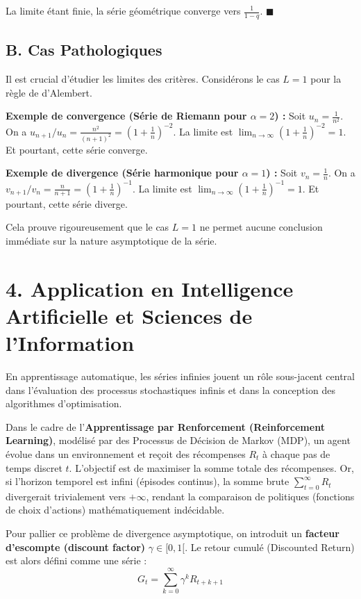 \documentclass[12pt, a4paper]{article}
\begin{document}
La limite étant finie, la série géométrique converge vers $\frac{1}{1 - q}$. $\blacksquare$

\subsection{B. Cas Pathologiques}

Il est crucial d'étudier les limites des critères. Considérons le cas $L=1$ pour la règle de d'Alembert.

\textbf{Exemple de convergence (Série de Riemann pour $\alpha=2$) :}
Soit $u_n = \frac{1}{n^2}$. On a $u_{n+1} / u_n = \frac{n^2}{(n+1)^2} = \left(1 + \frac{1}{n}\right)^{-2}$.
La limite est $\lim_{n \to \infty} \left(1 + \frac{1}{n}\right)^{-2} = 1$. Et pourtant, cette série converge.

\textbf{Exemple de divergence (Série harmonique pour $\alpha=1$) :}
Soit $v_n = \frac{1}{n}$. On a $v_{n+1} / v_n = \frac{n}{n+1} = \left(1 + \frac{1}{n}\right)^{-1}$.
La limite est $\lim_{n \to \infty} \left(1 + \frac{1}{n}\right)^{-1} = 1$. Et pourtant, cette série diverge.

Cela prouve rigoureusement que le cas $L=1$ ne permet aucune conclusion immédiate sur la nature asymptotique de la série.

\section{4. Application en Intelligence Artificielle et Sciences de l'Information}

En apprentissage automatique, les séries infinies jouent un rôle sous-jacent central dans l'évaluation des processus stochastiques infinis et dans la conception des algorithmes d'optimisation.

Dans le cadre de l'\textbf{Apprentissage par Renforcement (Reinforcement Learning)}, modélisé par des Processus de Décision de Markov (MDP), un agent évolue dans un environnement et reçoit des récompenses $R_t$ à chaque pas de temps discret $t$. L'objectif est de maximiser la somme totale des récompenses. Or, si l'horizon temporel est infini (épisodes continus), la somme brute $\sum_{t=0}^\infty R_t$ divergerait trivialement vers $+\infty$, rendant la comparaison de politiques (fonctions de choix d'actions) mathématiquement indécidable.

Pour pallier ce problème de divergence asymptotique, on introduit un \textbf{facteur d'escompte (discount factor)} $\gamma \in [0, 1[$. Le retour cumulé (Discounted Return) est alors défini comme une série :
$$G_t = \sum_{k=0}^\infty \gamma^k R_{t+k+1}$$
\end{document}
